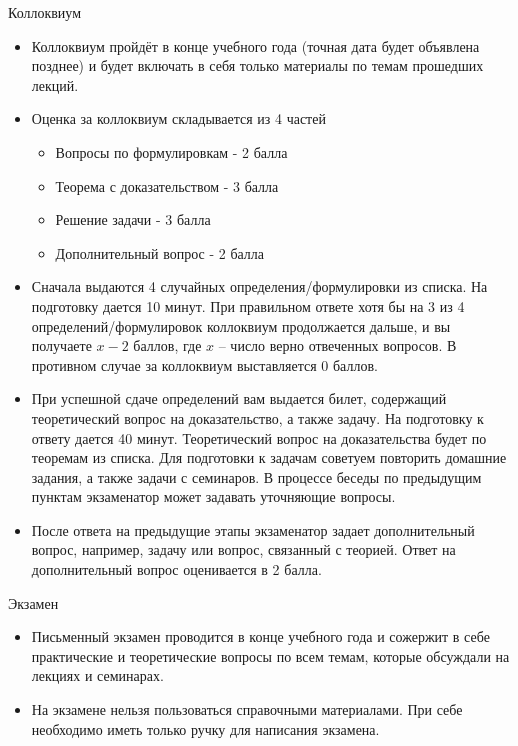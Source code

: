 \documentclass[9pt, aspectratio=169]{beamer}
\begin{document}
\begin{frame}{Коллоквиум}
    \begin{itemize}
        \item Коллоквиум пройдёт в конце учебного года (точная дата будет объявлена позднее) и будет включать в себя только материалы по темам прошедших лекций.
        \item Оценка за коллоквиум складывается из 4 частей
        \begin{itemize}
            \item Вопросы по формулировкам - 2 балла
            \item Теорема с доказательством - 3 балла
            \item Решение задачи - 3 балла
            \item Дополнительный вопрос - 2 балла
        \end{itemize}
        \item Сначала выдаются 4 случайных определения/формулировки из списка. На подготовку дается 10 минут. При правильном ответе хотя бы на 3 из 4 определений/формулировок коллоквиум продолжается дальше, и вы получаете $x-2$ баллов, где $x$ – число верно отвеченных вопросов. В противном случае за коллоквиум выставляется 0 баллов.
        \item При успешной сдаче определений вам выдается билет, содержащий теоретический вопрос на доказательство, а также задачу. На подготовку к ответу дается 40 минут. Теоретический вопрос на доказательства будет по теоремам из списка. Для подготовки к задачам советуем повторить домашние задания, а также задачи с семинаров.
        В процессе беседы по предыдущим пунктам экзаменатор может задавать уточняющие вопросы. 
        \item После ответа на предыдущие этапы экзаменатор задает дополнительный вопрос, например, задачу или вопрос, связанный с теорией. Ответ на дополнительный вопрос оценивается в 2 балла.
    \end{itemize}
\end{frame}

\begin{frame}{Экзамен}
    \begin{itemize}
        \item Письменный экзамен проводится в конце учебного года и сожержит в себе практические и теоретические вопросы по всем темам, которые обсуждали на лекциях и семинарах.
        \item На экзамене нельзя пользоваться справочными материалами. При себе необходимо иметь только ручку для написания экзамена.
    \end{itemize}
\end{frame}
\end{document}
